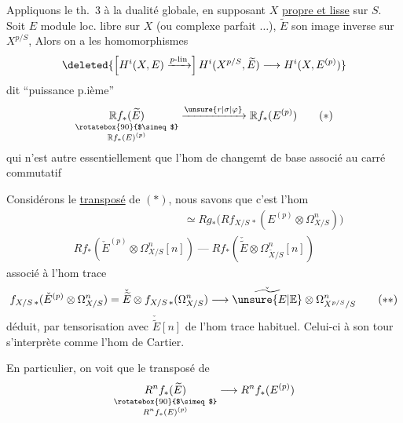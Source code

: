 Appliquons le th.~3 à la dualité globale, en supposant $X$ \uline{propre et lisse} sur $S$. Soit $E$ module loc. libre sur $X$ (ou complexe parfait $\ldots$), $\widetilde E$ son image inverse sur $X^{p/S}$,  Alors on a les homomorphismes
\[
\deleted{\left[H^i(X,E)\xrightarrow{p\text{-lin}}\right]H^i(X^{p/S},\widetilde E)\longrightarrow H^i(X,E^{(p)})}
\]
dit ``puissance p.ième''
\[
 \underset{\substack{\rotatebox{90}{$\simeq$}\\\mathbb R f_*(E)^{(p)}}}{\mathbb R f_*(\widetilde E)}
 \xrightarrow{\unsure{r|\sigma|\varphi}}\mathbb R f_*(E^{(p)})\tag*{($\ast$)}
\]
qui n'est autre essentiellement que l'hom de changemt de base associé au carré commutatif


Considérons le \uline{transposé} de $(\ast)$, nous savons que c'est l'hom
\[
\begin{aligned}
&\hspace{10em}\simeq Rg_*\bigl(Rf_{X/S\,*}(E^{(p)}\otimes\Omega^n_{X/S})\bigr)\\
&Rf_*(\check E^{(p)}\otimes\Omega^n_{X/S}[n])\mathrel{\text{---}}
 Rf_*(\check{\widetilde E}\otimes\Omega^n_{\widetilde X/S}[n])
\end{aligned}
\]
associé à l'hom trace
\[
 f_{X/S\,*}(\check E^{(p)}\otimes\Omega^n_{X/S})
 =\check{\widetilde E}\otimes f_{X/S\,*}(\Omega^n_{X/S})
 \longrightarrow\check{\widetilde{\unsure{E|\mathbb E}}}\otimes\Omega^n_{X^{p/S}/S}\tag*{($\ast\ast$)}
\]
déduit, par tensorisation avec $\check{\widetilde E}[n]$  de l'hom trace habituel. Celui-ci à son tour s'interprète comme l'hom  de Cartier.

En particulier, on voit que le transposé de
\[
 \underset{\substack{\rotatebox{90}{$\simeq$}\\R^nf_*(E)^{(p)}}}{R^nf_*(\widetilde E)}
 \longrightarrow R^nf_*(E^{(p)})
\]
